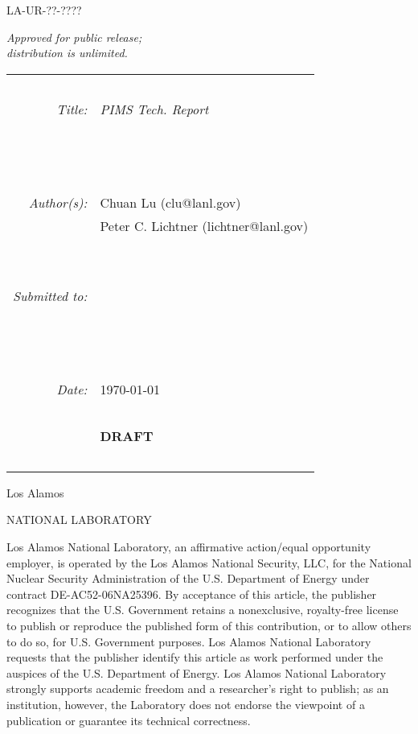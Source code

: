 \documentclass[12pt]{article}
\newcommand{\bc}{\begin{center}}
\newcommand{\ec}{\end{center}}
\begin{document}


\noindent
{\large\sffamily LA-UR-??-????}

\medskip

\noindent
\scriptsize
{\em Approved for public release;}\\
{\em distribution is unlimited.}

\normalsize

\bc
\begin{tabular}{r|l}
~ & ~\\
{\em Title:} & {\sl PIMS Tech. Report}\\
~ & ~\\
~ & ~\\
~ & ~\\
{\em Author(s):} & Chuan Lu (clu@lanl.gov)\\
~ & Peter C. Lichtner (lichtner@lanl.gov)\\
~ & ~\\
~ & ~\\
{\em Submitted to:} & \\
~ & ~\\
~ & ~\\
~ & ~\\
{\em Date:} & \today \\
~ & ~\\
~ & {\bf \large DRAFT}\\
~ & ~\\
\end{tabular}
\ec

\vfill

\noindent
{\Huge\sffamily Los Alamos}

\vspace{-8pt}

\noindent
{\sffamily NATIONAL LABORATORY}

\vspace{-6pt}

\noindent
\scriptsize
Los Alamos National Laboratory, an affirmative action/equal opportunity employer, is operated by the Los Alamos National Security, LLC, for the National Nuclear Security Administration of the U.S. Department of Energy under contract DE-AC52-06NA25396. By acceptance of this article, the publisher recognizes that the U.S. Government retains a nonexclusive, royalty-free license to publish or reproduce the published form of this contribution, or to allow others to do so, for U.S. Government purposes. Los Alamos National Laboratory requests that the publisher identify this article as work performed under the auspices of the U.S. Department of Energy. Los Alamos National Laboratory strongly supports academic freedom and a researcher's right to publish; as an institution, however, the Laboratory does not endorse the viewpoint of a publication or guarantee its technical correctness.
\end{document}
